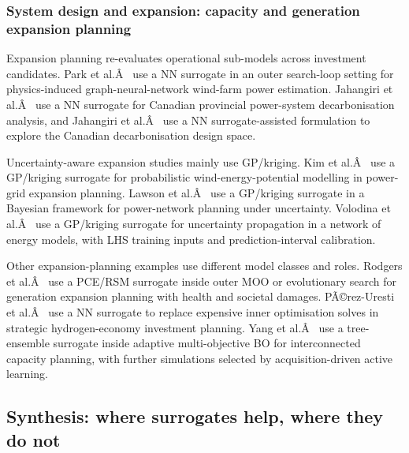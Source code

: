 \subsubsection{System design and expansion: capacity and generation expansion planning}
\label{sec:apps:expansion}

Expansion planning re-evaluates operational sub-models across investment
candidates. Park et al.Â~\cite{Park2019} use a NN surrogate in an outer
search-loop setting for physics-induced graph-neural-network wind-farm
power estimation. Jahangiri et al.Â~\cite{Jahangiri20244849} use a NN
surrogate for Canadian provincial power-system decarbonisation analysis,
and Jahangiri et al.Â~\cite{Jahangiri2023} use a NN surrogate-assisted
formulation to explore the Canadian decarbonisation design space.

Uncertainty-aware expansion studies mainly use GP/kriging. Kim et
al.Â~\cite{Kim2021} use a GP/kriging surrogate for probabilistic
wind-energy-potential modelling in power-grid expansion planning. Lawson
et al.Â~\cite{Lawson201647} use a GP/kriging surrogate in a Bayesian
framework for power-network planning under uncertainty. Volodina et
al.Â~\cite{Volodina2022} use a GP/kriging surrogate for uncertainty
propagation in a network of energy models, with LHS training inputs and
prediction-interval calibration.

Other expansion-planning examples use different model classes and roles.
Rodgers et al.Â~\cite{Rodgers2018951} use a PCE/RSM surrogate inside outer
MOO or evolutionary search for generation expansion planning with health
and societal damages. PÃ©rez-Uresti et al.Â~\cite{Pérez-Uresti2023} use a NN
surrogate to replace expensive inner optimisation solves in strategic
hydrogen-economy investment planning. Yang et al.Â~\cite{Yang2025} use a
tree-ensemble surrogate inside adaptive multi-objective BO for
interconnected capacity planning, with further simulations selected by
acquisition-driven active learning.

\subsection{Synthesis: where surrogates help, where they do not}
\label{sec:apps:synthesis}

